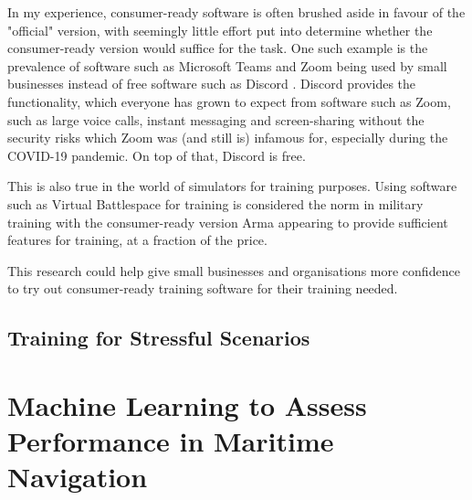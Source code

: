 \documentclass[12pt]{article}
\begin{document}
In my experience, consumer-ready software is often brushed aside in favour of the "official" version, with seemingly little effort put into determine whether the consumer-ready version would suffice for the task. One such example is the prevalence of software such as Microsoft Teams \cite{MicrosoftTeams} and Zoom \cite{Zoom} being used by small businesses instead of free software such as Discord \cite{Discord}. Discord provides the functionality, which everyone has grown to expect from software such as Zoom, such as large voice calls, instant messaging and screen-sharing without the security risks which Zoom was (and still is) infamous for, especially during the COVID-19 pandemic. On top of that, Discord is free. 

This is also true in the world of simulators for training purposes. Using software such as Virtual Battlespace for training is considered the norm in military training with the consumer-ready version Arma appearing to provide sufficient features for training, at a fraction of the price. 

This research could help give small businesses and organisations more confidence to try out consumer-ready training software for their training needed. 



\subsection{Training for Stressful Scenarios}

\section{Machine Learning to Assess Performance in Maritime Navigation}

\end{document}
